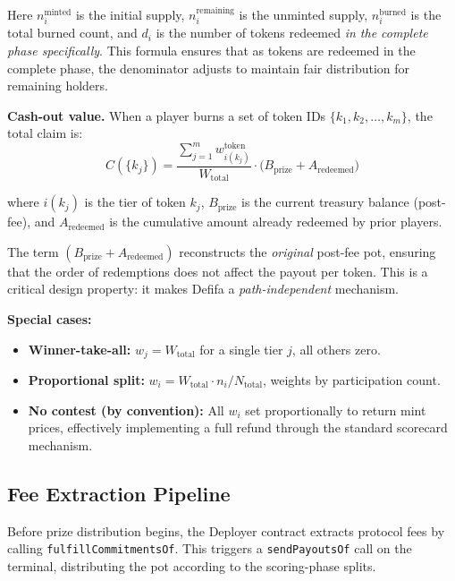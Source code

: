 \documentclass[11pt,a4paper]{article}
\begin{document}
Here $n_i^{\text{minted}}$ is the initial supply, $n_i^{\text{remaining}}$ is the unminted supply, $n_i^{\text{burned}}$ is the total burned count, and $d_i$ is the number of tokens redeemed \emph{in the complete phase specifically}. This formula ensures that as tokens are redeemed in the complete phase, the denominator adjusts to maintain fair distribution for remaining holders.

\textbf{Cash-out value.} When a player burns a set of token IDs $\{k_1, k_2, \ldots, k_m\}$, the total claim is:
\begin{equation}
\boxed{C(\{k_j\}) = \frac{\displaystyle\sum_{j=1}^{m} w_{i(k_j)}^{\text{token}}}{W_{\text{total}}} \cdot \bigl(B_{\text{prize}} + A_{\text{redeemed}}\bigr)}
\label{eq:cashout}
\end{equation}

where $i(k_j)$ is the tier of token $k_j$, $B_{\text{prize}}$ is the current treasury balance (post-fee), and $A_{\text{redeemed}}$ is the cumulative amount already redeemed by prior players.

The term $(B_{\text{prize}} + A_{\text{redeemed}})$ reconstructs the \emph{original} post-fee pot, ensuring that the order of redemptions does not affect the payout per token. This is a critical design property: it makes Defifa a \emph{path-independent} mechanism.

\textbf{Special cases:}
\begin{itemize}[nosep]
    \item \textbf{Winner-take-all:} $w_j = W_{\text{total}}$ for a single tier $j$, all others zero.
    \item \textbf{Proportional split:} $w_i = W_{\text{total}} \cdot n_i / N_{\text{total}}$, weights by participation count.
    \item \textbf{No contest (by convention):} All $w_i$ set proportionally to return mint prices, effectively implementing a full refund through the standard scorecard mechanism.
\end{itemize}

\subsection{Fee Extraction Pipeline}

Before prize distribution begins, the Deployer contract extracts protocol fees by calling \texttt{fulfill\-Commitments\-Of}. This triggers a \texttt{send\-Payouts\-Of} call on the terminal, distributing the pot according to the scoring-phase splits.
\end{document}
